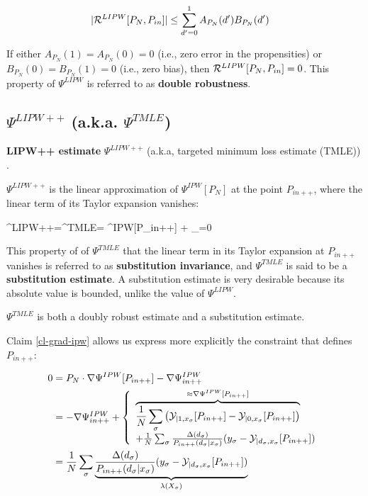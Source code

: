 \begin{align}
|{\cal R}^{LIPW}[P_N,P_{in}]|&\leq
\sum_{d'=0}^1
A_{P_N}(d')B_{P_N}(d')
\end{align}

If either
$A_{P_N}(1)=A_{P_N}(0)=0$ (i.e.,
zero error in the propensities) or
$B_{P_N}(0)=B_{P_N}(1)=0$ (i.e.,
zero bias),
then ${\cal R}^{LIPW}[P_N,P_{in}]=0$.
This property
of $\Psi^{LIPW}$ is referred to as {\bf double robustness}.


\subsection{$\Psi^{LIPW++}$ (a.k.a. $\Psi^{TMLE}$)}

{\bf LIPW++ estimate}
$\Psi^{LIPW++}$
(a.k.a, targeted minimum loss estimate (TMLE)) .

$\Psi^{LIPW++}$ is the
linear approximation
 of $\Psi^{IPW}[P_N]$ at the point $P_{in++}$,
where the linear term
of its Taylor expansion vanishes:

\beq
\Psi^{LIPW++}=\Psi^{TMLE}=
\Psi^{IPW}[P_{in++}] +
_{=0}
\eeq

This property of
of $\Psi^{TMLE}$
that the linear term
in its Taylor expansion at $P_{in++}$ vanishes
is referred to as {\bf substitution
invariance}, and $\Psi^{TMLE}$
is said to be a {\bf substitution estimate}.
A substitution estimate is
very desirable because
its
absolute value is bounded, unlike
the value of $\Psi^{LIPW}$.

$\Psi^{TMLE}$ is both
a doubly robust estimate and a substitution estimate.

Claim \ref{cl-grad-ipw} allows us
express
more explicitly the constraint that defines $P_{in++}$:

\begin{align}
0 &=
P_N\cdot\nabla\Psi^{IPW}[P_{in++}]-\nabla\Psi^{IPW}_{in++}
\\
&= -\nabla\Psi^{IPW}_{in++}+
\left\{
\begin{array}{l}
\overbrace{
\frac{1}{N}
\sum_\sigma
\left(
{\cal Y}_{|1,x_\sigma}[P_{in++}]
-
{\cal Y}_{|0,x_\sigma}[P_{in++}]
\right)
}^{ \approx \nabla\Psi^{IPW}[P_{in++}]}
\\
+
\frac{1}{N}
\sum_\sigma
\frac{\Delta(d_\sigma)}{P_{in++}(d_\sigma|x_\sigma)}
(y_\sigma-{\cal Y}_{|d_\sigma,x_\sigma}[P_{in++}])
\end{array}
\right.
\\
&=
\frac{1}{N}
\sum_\sigma \underbrace{
\frac{\Delta(d_\sigma)}{P_{in++}(d_\sigma|x_\sigma)}
(y_\sigma-{\cal Y}_{|d_\sigma,x_\sigma}[P_{in++}])
}_{\lambda(X_\sigma)}
\label{eq-loss-xi}
\end{align}


